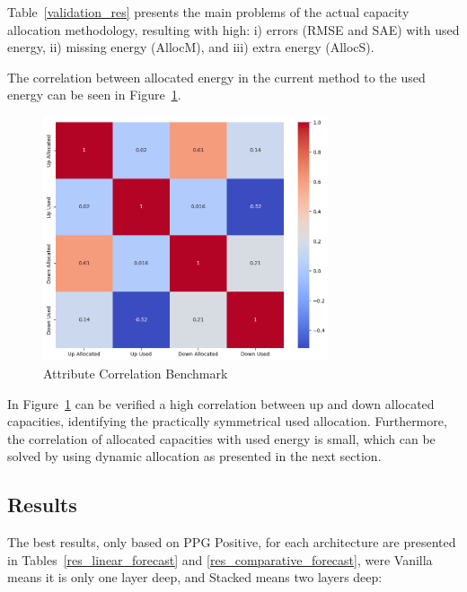 

Table~\ref{validation_res} presents the main problems of the actual capacity allocation methodology, resulting with high: i) errors (RMSE and SAE) with used energy, ii) missing energy (AllocM), and iii) extra energy (AllocS).

The correlation between allocated energy in the current method to the used energy can be seen in Figure~\ref{fig:Attribute_correlation_benchmark}.

\begin{figure}[H]
    \centering
    \includegraphics[width=0.75\textwidth]{plots/correlation_heatmap_benchmark.png}
    \caption{Attribute Correlation Benchmark}
    \label{fig:Attribute_correlation_benchmark}
  \end{figure}

In Figure~\ref{fig:Attribute_correlation_benchmark} can be verified a high correlation between up and down allocated capacities, identifying the practically symmetrical used allocation.
%
Furthermore, the correlation of allocated capacities with used energy is small, which can be solved by using dynamic allocation as presented in the next section.

\subsection{Results}

The best results, only based on PPG Positive, for each architecture are presented in Tables~\ref{res_linear_forecast} and \ref{res_comparative_forecast}, were Vanilla means it is only one layer deep, and Stacked means two layers deep:



